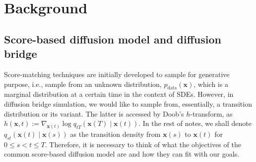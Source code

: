 \documentclass{article}
\newcommand{\x}{\mathbf{x}}
\begin{document}
\section{Background}
\subsection{Score-based diffusion model and diffusion bridge}
Score-matching techniques are initially developed to sample for generative purpose, i.e., sample from an unknown distribution, $p_{\text{data}}(\x)$, which is a marginal distribution at a certain time in the context of SDEs. However, in diffusion bridge simulation, we would like to sample from, essentially, a transition distribution or its variant. The latter is accessed by Doob's $h$-transform, as $h(\x, t):=\nabla_{\x(t)}\log q_{tT}(\x(T)\mid\x(t))$. In the rest of notes, we shall denote $q_{st}(\x(t)\mid\x(s))$ as the transition density from $\x(s)$ to $\x(t)$ for $0\leq s < t \leq T$. Therefore, it is necessary to think of what the objectives of the common score-based diffusion model are and how they can fit with our goals.
\end{document}
